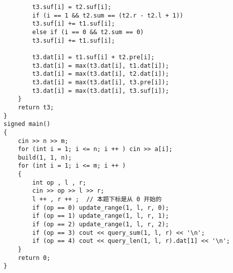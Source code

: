 \documentclass[E:/GsjzTle/main/main.tex]{subfiles}
\begin{document}
\begin{lstlisting}
		t3.suf[i] = t2.suf[i];
		if (i == 1 && t2.sum == (t2.r - t2.l + 1))
		t3.suf[i] += t1.suf[i];
		else if (i == 0 && t2.sum == 0)
		t3.suf[i] += t1.suf[i];
		
		t3.dat[i] = t1.suf[i] + t2.pre[i];
		t3.dat[i] = max(t3.dat[i], t1.dat[i]);
		t3.dat[i] = max(t3.dat[i], t2.dat[i]);
		t3.dat[i] = max(t3.dat[i], t3.pre[i]);
		t3.dat[i] = max(t3.dat[i], t3.suf[i]);
	}
	return t3;
}
signed main()
{
	cin >> n >> m;
	for (int i = 1; i <= n; i ++ ) cin >> a[i];
	build(1, 1, n);
	for (int i = 1; i <= m; i ++ )
	{
		int op , l , r;
		cin >> op >> l >> r;
		l ++ , r ++ ;  // 本题下标是从 0 开始的 
		if (op == 0) update_range(1, l, r, 0);
		if (op == 1) update_range(1, l, r, 1);
		if (op == 2) update_range(1, l, r, 2);
		if (op == 3) cout << query_sum(1, l, r) << '\n';
		if (op == 4) cout << query_len(1, l, r).dat[1] << '\n';
	}
	return 0;
}
\end{lstlisting}
\end{document}
